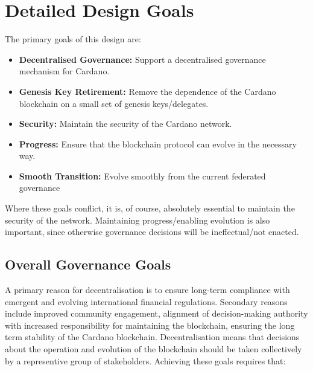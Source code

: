 \section{Detailed Design Goals}
\label{sect:goals}

The primary goals of this design are:

\begin{itemize}
\item
  \textbf{Decentralised Governance:}
  Support a decentralised governance mechanism for Cardano.
\item
  \textbf{Genesis Key Retirement:}
  Remove the dependence of the Cardano blockchain on a small set of genesis keys/delegates.
\item
  \textbf{Security:}
  Maintain the security of the Cardano network.
\item
  \textbf{Progress:}
  Ensure that the blockchain protocol can evolve in the necessary way.
\item
  \textbf{Smooth Transition:}
  Evolve smoothly from the current federated governance
\end{itemize}

Where these goals conflict, it is, of course, absolutely essential to maintain the security of the network.  Maintaining progress/enabling
evolution is also important, since otherwise governance decisions will be ineffectual/not enacted.

\pagebreak
\subsection{Overall Governance Goals}

A primary reason for decentralisation is to ensure long-term compliance with emergent and evolving international financial regulations.
Secondary reasons include improved community engagement, alignment of decision-making authority with increased responsibility for maintaining the blockchain,
ensuring the long term stability of the Cardano blockchain.  Decentralisation means that decisions about the operation and evolution of the blockchain
should be taken collectively by a representive group of stakeholders.
%
Achieving these goals requires that:

